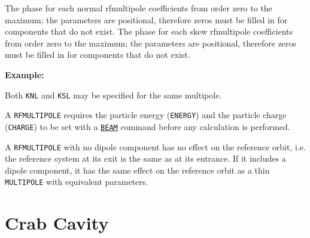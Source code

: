 \begin{madlist}
    The phase for each normal rfmultipole coefficients from
     order zero to the maximum; the parameters are positional,
     therefore zeros must be filled in for components that do not
     exist.  
    The phase for each skew rfmultipole coefficients from
     order zero to the maximum; the parameters are positional,
     therefore zeros must be filled in for components that do not
     exist.  
\end{madlist}


{\bf Example:}

Both {\tt KNL} and {\tt KSL} may be specified for the same multipole.  

A {\tt RFMULTIPOLE} requires the particle energy ({\tt ENERGY}) and the
particle charge ({\tt CHARGE}) to be set with a \hyperref[sec:beam]{\tt BEAM}
command before any calculation is performed. 


A {\tt RFMULTIPOLE} with no dipole component has no effect on the reference
orbit, i.e. the reference system at its exit is the same as at its
entrance. If it includes a dipole component, it has the same effect on
the reference orbit as a thin {\tt MULTIPOLE} with equivalent
parameters. 




\section{Crab Cavity}
\label{sec:crab_cavity}\label{sec:crabcavity}



